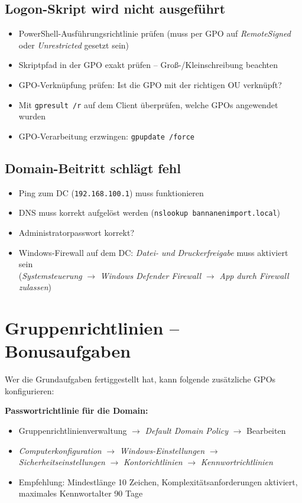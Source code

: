 \documentclass[11pt, oneside, numbers=noenddot]{scrbook}
\begin{document}
\subsection*{Logon-Skript wird nicht ausgeführt}
\begin{itemize}
  \item PowerShell-Ausführungsrichtlinie prüfen (muss per GPO auf \textit{RemoteSigned} oder \textit{Unrestricted} gesetzt sein)
  \item Skriptpfad in der GPO exakt prüfen -- Groß-/Kleinschreibung beachten
  \item GPO-Verknüpfung prüfen: Ist die GPO mit der richtigen OU verknüpft?
  \item Mit \texttt{gpresult /r} auf dem Client überprüfen, welche GPOs angewendet wurden
  \item GPO-Verarbeitung erzwingen: \texttt{gpupdate /force}
\end{itemize}

\subsection*{Domain-Beitritt schlägt fehl}
\begin{itemize}
  \item Ping zum DC (\texttt{192.168.100.1}) muss funktionieren
  \item DNS muss korrekt aufgelöst werden (\texttt{nslookup bannanenimport.local})
  \item Administratorpasswort korrekt?
  \item Windows-Firewall auf dem DC: \textit{Datei- und Druckerfreigabe} muss aktiviert sein\\
        (\textit{Systemsteuerung} $\rightarrow$ \textit{Windows Defender Firewall} $\rightarrow$ \textit{App durch Firewall zulassen})
\end{itemize}

\section{Gruppenrichtlinien -- Bonusaufgaben}

Wer die Grundaufgaben fertiggestellt hat, kann folgende zusätzliche GPOs konfigurieren:

\textbf{Passwortrichtlinie für die Domain:}
\begin{itemize}
  \item Gruppenrichtlinienverwaltung $\rightarrow$ \textit{Default Domain Policy} $\rightarrow$ Bearbeiten
  \item \textit{Computerkonfiguration} $\rightarrow$ \textit{Windows-Einstellungen} $\rightarrow$ \textit{Sicherheitseinstellungen} $\rightarrow$ \textit{Kontorichtlinien} $\rightarrow$ \textit{Kennwortrichtlinien}
  \item Empfehlung: Mindestlänge 10 Zeichen, Komplexitätsanforderungen aktiviert, maximales Kennwortalter 90 Tage
\end{itemize}
\end{document}
